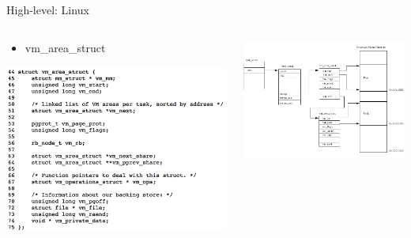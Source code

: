 \documentclass[aspectratio=169]{beamer}
\newcommand{\bi}{\begin{itemize}}
\newcommand{\ei}{\end{itemize}}
\begin{document}
\begin{frame}{High-level: Linux}
  \begin{columns}[T]
    \begin{column}{0.4\textwidth}
      \bi
    \item vm\_area\_struct
      \ei
      \includegraphics[scale=0.35]{./figures/linux3.png}
    \end{column}
    \begin{column}{0.6\textwidth}
      \includegraphics[scale=0.35]{./figures/linux1.png}
    \end{column}
  \end{columns}
\end{frame}
\end{document}
